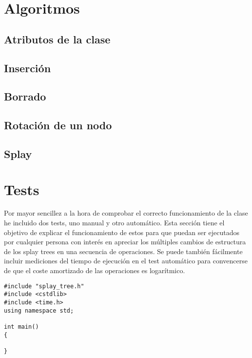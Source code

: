 \documentclass[letterpaper,12pt]{article}
\begin{document}
\section{Algoritmos}
\subsection{Atributos de la clase}
\subsection{Inserción}
\subsection{Borrado}
\subsection{Rotación de un nodo}
\subsection{Splay}

\appendix
\section{Tests}
Por mayor sencillez a la hora de comprobar el correcto funcionamiento de la 
clase he incluido dos tests, uno manual y otro automático. Esta sección tiene
el objetivo de explicar el funcionamiento de estos para que puedan ser 
ejecutados por cualquier persona con interés en apreciar los múltiples cambios
de estructura de los splay trees en una secuencia de operaciones. Se puede
también fácilmente incluir mediciones del tiempo de ejecución en el test 
automático para convencerse de que el coste amortizado de las operaciones es 
logarítmico.


\begin{lstlisting}
#include "splay_tree.h"
#include <cstdlib>
#include <time.h>
using namespace std;

int main()
{

}
\end{lstlisting}


\end{document}
